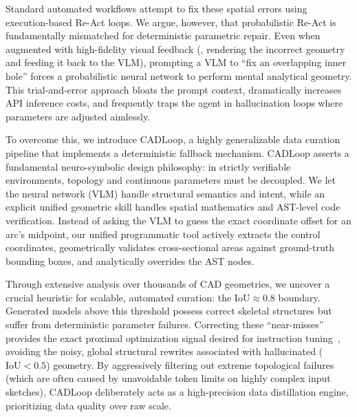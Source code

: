 Standard automated workflows attempt to fix these spatial errors using execution-based
Re-Act loops.
We argue, however, that probabilistic Re-Act is fundamentally mismatched for
deterministic parametric repair.
Even when augmented with high-fidelity visual feedback (\eg, rendering the incorrect
geometry and feeding it back to the VLM), prompting a VLM to ``fix an overlapping inner
hole'' forces a probabilistic neural network to perform mental analytical geometry.
This trial-and-error approach bloats the prompt context, dramatically increases API
inference costs, and frequently traps the agent in hallucination loops where parameters
are adjusted aimlessly.

To overcome this, we introduce CADLoop, a highly generalizable data curation
pipeline that implements a deterministic fallback mechanism.
CADLoop asserts a fundamental neuro-symbolic design philosophy: in strictly verifiable
environments, topology and continuous parameters must be decoupled.
We let the neural network (VLM) handle structural semantics and intent, while an explicit
unified geometric skill handles spatial mathematics and AST-level code
verification.
Instead of asking the VLM to guess the exact coordinate offset for an arc's midpoint, our
unified programmatic tool actively extracts the control coordinates, geometrically
validates cross-sectional areas against ground-truth bounding boxes, and analytically
overrides the AST nodes.

Through extensive analysis over thousands of CAD geometries, we uncover a crucial
heuristic for scalable, automated curation: the $\text{IoU} \approx 0.8$ boundary.
Generated models above this threshold possess correct skeletal structures but suffer from
deterministic parameter failures.
Correcting these ``near-misses'' provides the exact proximal optimization signal desired
for instruction tuning~\cite{Ouyang2022}, avoiding the noisy, global structural rewrites
associated with hallucinated ($\text{IoU} < 0.5$) geometry.
By aggressively filtering out extreme topological failures (which are often caused by
unavoidable token limits on highly complex input sketches), CADLoop deliberately acts as a
high-precision data distillation engine, prioritizing data quality over raw scale.

